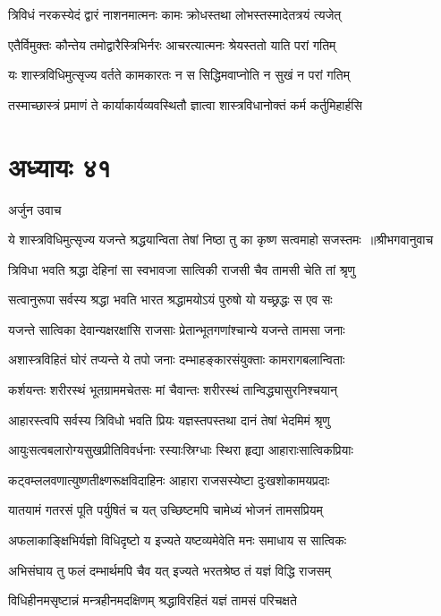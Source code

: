 \twolineshloka
{त्रिविधं नरकस्येदं द्वारं नाशनमात्मनः}
{कामः क्रोधस्तथा लोभस्तस्मादेतत्रयं त्यजेत्}


\twolineshloka
{एतैर्विमुक्तः कौन्तेय तमोद्वारैस्त्रिभिर्नरः}
{आचरत्यात्मनः श्रेयस्ततो याति परां गतिम्}


\twolineshloka
{यः शास्त्रविधिमुत्सृज्य वर्तते कामकारतः}
{न स सिद्धिमवाप्नोति न सुखं न परां गतिम्}


\twolineshloka
{तस्माच्छास्त्रं प्रमाणं ते कार्याकार्यव्यवस्थितौ}
{ज्ञात्वा शास्त्रविधानोक्तं कर्म कर्तुमिहार्हसि}


\chapter{अध्यायः ४१}
\twolineshloka
{अर्जुन उवाच}
{}


\threelineshloka
{ये शास्त्रविधिमुत्सृज्य यजन्ते श्रद्धयान्विता}
{तेषां निष्ठा तु का कृष्ण सत्वमाहो सजस्तमः ॥श्रीभगवानुवाच}
{}


\twolineshloka
{त्रिविधा भवति श्रद्धा देहिनां सा स्वभावजा}
{सात्विकी राजसी चैव तामसी चेति तां श्रृणु}


\twolineshloka
{सत्वानुरूपा सर्वस्य श्रद्धा भवति भारत}
{श्रद्धामयोऽयं पुरुषो यो यच्छ्रद्धः स एव सः}


\twolineshloka
{यजन्ते सात्विका देवान्यक्षरक्षांसि राजसाः}
{प्रेतान्भूतगणांश्चान्ये यजन्ते तामसा जनाः}


\twolineshloka
{अशास्त्रविहितं घोरं तप्यन्ते ये तपो जनाः}
{दम्भाहङ्कारसंयुक्ताः कामरागबलान्विताः}


\twolineshloka
{कर्शयन्तः शरीरस्थं भूतग्राममचेतसः}
{मां चैवान्तः शरीरस्थं तान्विद्ध्यासुरनिश्चयान्}


\twolineshloka
{आहारस्त्वपि सर्वस्य त्रिविधो भवति प्रियः}
{यज्ञस्तपस्तथा दानं तेषां भेदमिमं श्रृणु}


\twolineshloka
{आयुःसत्वबलारोग्यसुखप्रीतिविवर्धनाः}
{रस्याःस्रिग्धाः स्थिरा हृद्या आहाराःसात्विकप्रियाः}


\twolineshloka
{कट्वम्ललवणात्युष्णतीक्ष्णरूक्षविदाहिनः}
{आहारा राजसस्येष्टा दुःखशोकामयप्रदाः}


\twolineshloka
{यातयामं गतरसं पूति पर्युषितं च यत्}
{उच्छिष्टमपि चामेध्यं भोजनं तामसप्रियम्}


\twolineshloka
{अफलाकाङ्क्षिभिर्यज्ञो विधिदृष्टो य इज्यते}
{यष्टव्यमेवेति मनः समाधाय स सात्विकः}


\twolineshloka
{अभिसंघाय तु फलं दम्भार्थमपि चैव यत्}
{इज्यते भरतश्रेष्ठ तं यज्ञं विद्धि राजसम्}


\twolineshloka
{विधिहीनमसृष्टान्नं मन्त्रहीनमदक्षिणम्}
{श्रद्धाविरहितं यज्ञं तामसं परिचक्षते}


